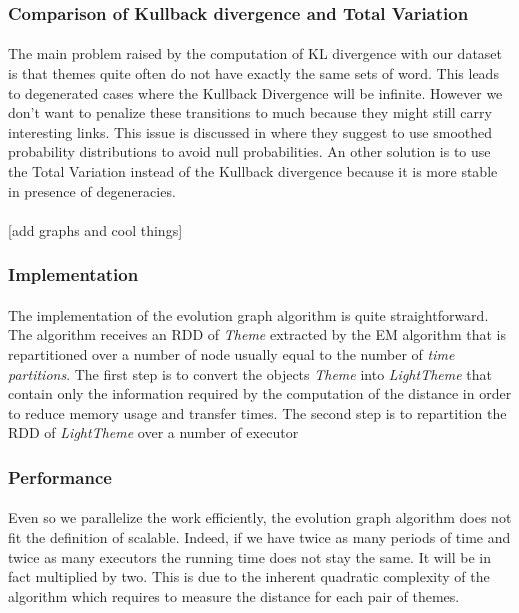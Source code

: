 \subsubsection{Comparison of Kullback divergence and Total Variation}

\paragraph{}
The main problem raised by the computation of KL divergence with our dataset is that themes quite often do not have exactly the same sets of word. This leads to degenerated cases where the Kullback Divergence will be infinite. However we don't want to penalize these transitions to much because they might still carry interesting links. This issue is discussed in \cite{de2010grammatical} where they suggest to use smoothed probability distributions to avoid null probabilities. An other solution is to use the Total Variation instead of the Kullback divergence because it is more stable in presence of degeneracies.

\paragraph{}
[add graphs and cool things]

\subsubsection{Implementation}
\label{sec:EvoGraphImplementation}
\paragraph{}
The implementation of the evolution graph algorithm is quite straightforward. The algorithm receives an RDD of \emph{Theme} extracted by the EM algorithm that is repartitioned over a number of node usually equal to the number of \emph{time partitions}. The first step is to convert the objects \emph{Theme} into \emph{LightTheme} that contain only the information required by the computation of the distance in order to reduce memory usage and transfer times. The second step is to repartition the RDD of \emph{LightTheme} over a number of executor 

\subsubsection{Performance}
\label{sec:EvoGraphPerformance}
\paragraph{}
Even so we parallelize the work efficiently, the evolution graph algorithm does not fit the definition of scalable. Indeed, if we have twice as many periods of time and twice as many executors the running time does not stay the same. It will be in fact multiplied by two. This is due to the inherent quadratic complexity of the algorithm which requires to measure the distance for each pair of themes.

